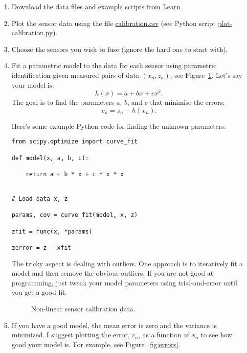 \documentclass[a4paper, 12]{article}
\newcommand{\reffig}[1]{\mbox{Figure~\ref{fig:#1}}}
\begin{document}
  
\begin{enumerate}
\item Download the data files and example scripts from Learn.
  
\item Plot the sensor data using the file \url{calibration.csv} (see
  Python script \url{plot-calibration.py}). 

\item Choose the sensors you wish to fuse (ignore the hard one to
  start with).

 
\item Fit a parametric model to the data for each sensor using
  parametric identification given measured pairs of data $(x_n, z_n)$,
  see \reffig{fit}.  Let's say your model is:
  \begin{equation}
    h(x) = a + b x + c x^2.
  \end{equation}
  The goal is to find the parameters $a$, $b$, and $c$ that minimise
  the errors:
    \begin{equation}
    v_n = z_n - h(x_n).
    \end{equation}

    Here's some example Python code for finding the unknown parameters:
%
\begin{verbatim}
from scipy.optimize import curve_fit

def model(x, a, b, c):

    return a + b * x + c * x * x

    
# Load data x, z

params, cov = curve_fit(model, x, z)    

zfit = func(x, *params)

zerror = z - xfit
\end{verbatim}

  The tricky aspect is dealing with outliers.  One approach is to
  iteratively fit a model and then remove the obvious outliers.  If
  you are not good at programming, just tweak your model parameters
  using trial-and-error until you get a good fit.

  \begin{figure}[!h]
  \centering
  
  \caption{Non-linear sensor calibration data.}
  \label{fig:fit}    
  \end{figure}

  
  \item If you have a good model, the mean error is zero and the
    variance is minimized.  I suggest plotting the error, $v_n$, as a
    function of $x_n$ to see how good your model is.  For example, see
    \reffig{errors}.


\end{enumerate}
\end{document}
